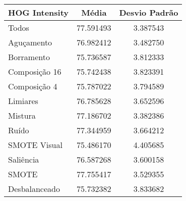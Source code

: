 


\begin{table}[!htbp]
\centering
\caption{}
\label{tab:resultados:x:melhor}
\begin{tabular}{|l|c|c|}
\hline
\textbf{HOG Intensity} & \textbf{Média}     & \textbf{Desvio Padrão} \\ \hline
   Todos        &  77.591493 &  3.387543  \\ \hline
  Aguçamento    &  76.982412 &  3.482750  \\ \hline
  Borramento    &  75.736587 &  3.812333  \\ \hline
  Composição 16 &  75.742438 &  3.823391  \\ \hline
  Composição 4  &  75.787022 &  3.794589  \\ \hline
  Limiares      &  76.785628 &  3.652596  \\ \hline
  Mistura       &  77.186702 &  3.382386  \\ \hline
  Ruído         &  77.344959 &  3.664212  \\ \hline
  SMOTE Visual  &  75.486170 &  4.405685  \\ \hline
  Saliência     &  76.587268 &  3.600158  \\ \hline
 SMOTE          &  77.755417 &  3.529355  \\ \hline
Desbalanceado   &  75.732382 &  3.833682  \\ \hline
\end{tabular}
\end{table}

